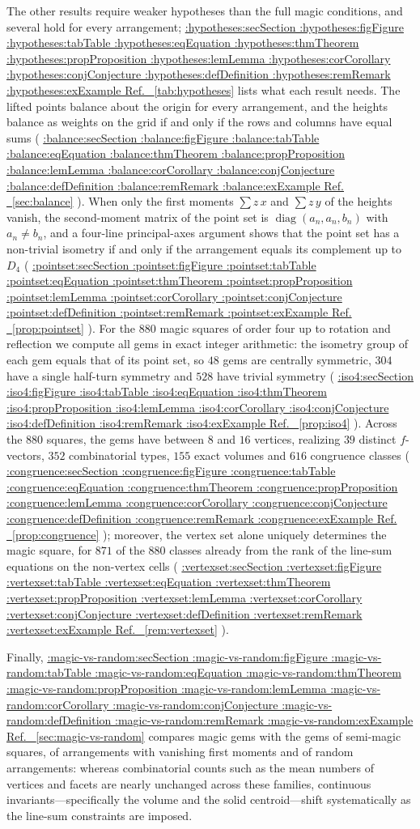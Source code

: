 \documentclass[11pt,a4paper]{article}
\makeatletter
\def\Cref@getprefix#1:#2\relax{#1}
\def\Cref@prefix@sec{sec}
\def\Cref@prefix@fig{fig}
\def\Cref@prefix@tab{tab}
\def\Cref@prefix@eq{eq}
\def\Cref@prefix@thm{thm}
\def\Cref@prefix@prop{prop}
\def\Cref@prefix@lem{lem}
\def\Cref@prefix@cor{cor}
\def\Cref@prefix@conj{conj}
\def\Cref@prefix@def{def}
\def\Cref@prefix@rem{rem}
\def\Cref@prefix@ex{ex}
\def\Cref@type@cap#1{%
  \edef\Cref@tmp{#1}%
  \ifx\Cref@tmp\Cref@prefix@sec Section%
  \else\ifx\Cref@tmp\Cref@prefix@fig Figure%
  \else\ifx\Cref@tmp\Cref@prefix@tab Table%
  \else\ifx\Cref@tmp\Cref@prefix@eq Equation%
  \else\ifx\Cref@tmp\Cref@prefix@thm Theorem%
  \else\ifx\Cref@tmp\Cref@prefix@prop Proposition%
  \else\ifx\Cref@tmp\Cref@prefix@lem Lemma%
  \else\ifx\Cref@tmp\Cref@prefix@cor Corollary%
  \else\ifx\Cref@tmp\Cref@prefix@conj Conjecture%
  \else\ifx\Cref@tmp\Cref@prefix@def Definition%
  \else\ifx\Cref@tmp\Cref@prefix@rem Remark%
  \else\ifx\Cref@tmp\Cref@prefix@ex Example%
  \else Ref.%
  \fi\fi\fi\fi\fi\fi\fi\fi\fi\fi\fi\fi
}
\DeclareRobustCommand{\Cref}[1]{%
  \begingroup
  \edef\Cref@label{#1}%
  \edef\Cref@prefix{\expandafter\Cref@getprefix\Cref@label:\relax}%
  \hyperref[#1]{\Cref@type@cap{\Cref@prefix}~\ref*{#1}}%
  \endgroup
}
\theoremstyle{plain}
\theoremstyle{definition}
\theoremstyle{remark}
\makeatother
\begin{document}
The other results require weaker hypotheses than the full magic conditions, and several hold for every arrangement; \Cref{tab:hypotheses} lists what each result needs.
The lifted points balance about the origin for every arrangement, and the heights balance as weights on the grid if and only if the rows and columns have equal sums (\Cref{sec:balance}).
When only the first moments $\sum z\,x$ and $\sum z\,y$ of the heights vanish, the second-moment matrix of the point set is $\operatorname{diag}(a_n,a_n,b_n)$ with $a_n\ne b_n$, and a four-line principal-axes argument shows that the point set has a non-trivial isometry if and only if the arrangement equals its complement up to $D_4$ (\Cref{prop:pointset}).
For the $880$ magic squares of order four up to rotation and reflection we compute all gems in exact integer arithmetic: the isometry group of each gem equals that of its point set, so $48$ gems are centrally symmetric, $304$ have a single half-turn symmetry and $528$ have trivial symmetry (\Cref{prop:iso4}). Across the $880$ squares, the gems have between $8$ and $16$ vertices, realizing $39$ distinct $f$-vectors, $352$ combinatorial types, $155$ exact volumes and $616$ congruence classes (\Cref{prop:congruence}); moreover, the vertex set alone uniquely determines the magic square, for $871$ of the $880$ classes already from the rank of the line-sum equations on the non-vertex cells (\Cref{rem:vertexset}).

Finally, \Cref{sec:magic-vs-random} compares magic gems with the gems of semi-magic squares, of arrangements with vanishing first moments and of random arrangements: whereas combinatorial counts such as the mean numbers of vertices and facets are nearly unchanged across these families, continuous invariants—specifically the volume and the solid centroid—shift systematically as the line-sum constraints are imposed.
\end{document}
